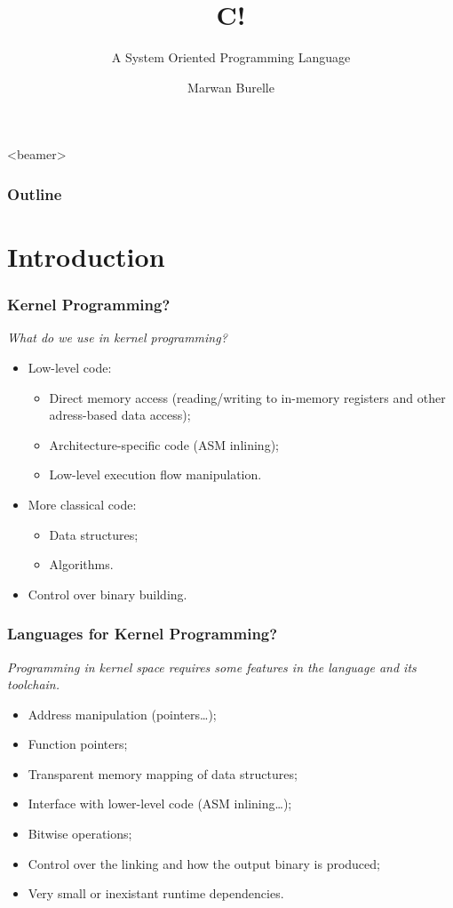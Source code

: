 \documentclass[pdftex]{beamer}
\title{{C!}}
\subtitle{A System Oriented Programming Language}
\author{Marwan Burelle}
\institute{
  marwan.burelle@lse.epita.fr\\
  \url{http://www.lse.epita.fr/}
}
\date{}
\begin{document}


\begin{frame}
  \titlepage
\end{frame}

\begin{frame}<beamer>
  \frametitle{Outline}
  \tableofcontents
\end{frame}



\section{Introduction}

\begin{frame}
  \frametitle{Kernel Programming?}
  \emph{What do we use in kernel programming?}
  \begin{itemize}
  \item Low-level code:
    \begin{itemize}
    \item Direct memory access (reading/writing to in-memory registers
      and other adress-based data access);
    \item Architecture-specific code (ASM inlining);
    \item Low-level execution flow manipulation.
    \end{itemize}
  \item More classical code:
    \begin{itemize}
    \item Data structures;
    \item Algorithms.
    \end{itemize}
  \item Control over binary building.
  \end{itemize}
\end{frame}

\begin{frame}
  \frametitle{Languages for Kernel Programming?}
  \emph{Programming in kernel space requires some features in the
    language and its toolchain.}
  \begin{itemize}
  \item Address manipulation (pointers\ldots);
  \item Function pointers;
  \item Transparent memory mapping of data structures;
  \item Interface with lower-level code (ASM inlining\ldots);
  \item Bitwise operations;
  \item Control over the linking and how the output binary is produced;
  \item Very small or inexistant runtime dependencies.
  \end{itemize}
\end{frame}
\end{document}
